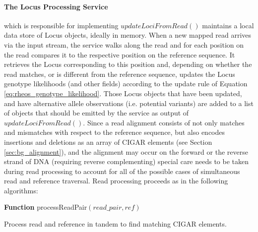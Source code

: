 \paragraph{The Locus Processing Service} which is responsible for implementing $updateLociFromRead()$ maintains a local data store of Locus objects, ideally in memory. When a new mapped read arrives via the input stream, the service walks along the read and for each position on the read compares it to the respective position on the reference sequence. It retrieves the Locus corresponding to this position and, depending on whether the read matches, or is different from the reference sequence, updates the Locus genotype likelihoods (and other fields) according to the update rule of Equation \ref{eq:rheos_genotype_likelihood}. Those Locus objects that have been updated, and have alternative allele observations (i.e. potential variants) are added to a list of objects that should be emitted by the service as output of $updateLociFromRead()$. Since a read alignment consists of not only matches and mismatches with respect to the reference sequence, but also encodes insertions and deletions as an array of CIGAR elements (see Section \ref{sec:bg_alignment}), and the alignment may occur on the forward or the reverse strand of DNA (requiring reverse complementing) special care needs to be taken during read processing to account for all of the possible cases of simultaneous read and reference traversal. Read processing proceeds as in the following algorithms:

\begin{algorithm2e}[h]
    \DontPrintSemicolon
    \footnotesize
    \textbf{Function} {\sc processReadPair}$(read\_pair, ref)$
    \caption{Process read and reference in tandem to find matching CIGAR elements.}\label{ag:process_read_pair}
\end{algorithm2e}

